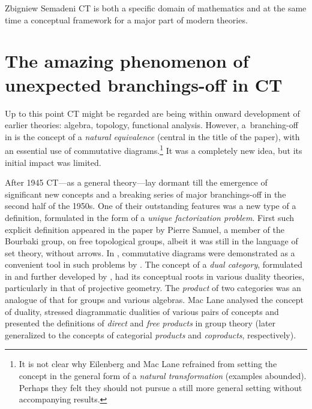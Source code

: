 \begin{artengenv}{Zbigniew Semadeni}
CT is both a specific domain of mathematics and at the same time a conceptual framework 
for a major part of modern theories. 

\section{The amazing phenomenon of unexpected branchings-off in CT}
Up to this point CT might be regarded are being within onward development of 
earlier theories: algebra, topology, functional analysis. However, a~branching-off 
in \parencite{E-ML} is the concept of a \textit{natural equivalence} (central in the title 
of the paper), with an essential use of commutative diagrams.\footnote{ It is not 
clear why Eilenberg and Mac Lane refrained from setting the concept in the general 
form of a \textit{natural transformation} (examples abounded). Perhaps they felt 
they should not pursue a still more general setting without accompanying 
results.} %
It was a completely new idea, but its initial impact was limited. 

After 1945 CT---as a general theory---lay dormant till the emergence of 
significant new concepts and a breaking series of major branchings-off in the 
second half of the 1950s. One of their outstanding features was a new type of a 
definition, formulated in the form of a \textit{unique factorization problem}. 
First such explicit definition \parencite*{Samuel} appeared in the paper by Pierre Samuel, 
a member of the Bourbaki group, on free topological groups, albeit it was still 
in the language of set theory, without arrows. 
In \cite*{Duality}, commutative diagrams were demonstrated as a convenient 
tool in such problems by  \citeauthor{Duality}. 
The concept of a \textit{dual category}, formulated in \parencite[p.259]{E-ML} and 
further developed by \citeauthor{Duality} \parencite*{Duality}, had its conceptual roots in various 
duality theories, particularly in that of projective geometry. The \textit{product} 
of two categories was an analogue of that for groups and various algebras. 
Mac Lane analysed the concept of duality, 
stressed diagrammatic dualities of various pairs of concepts and presented the 
definitions of \textit{direct} and \textit{free products} in group theory (later 
generalized to the concepts of categorial \textit{products} and \textit{coproducts}, 
respectively). 


\end{artengenv}

